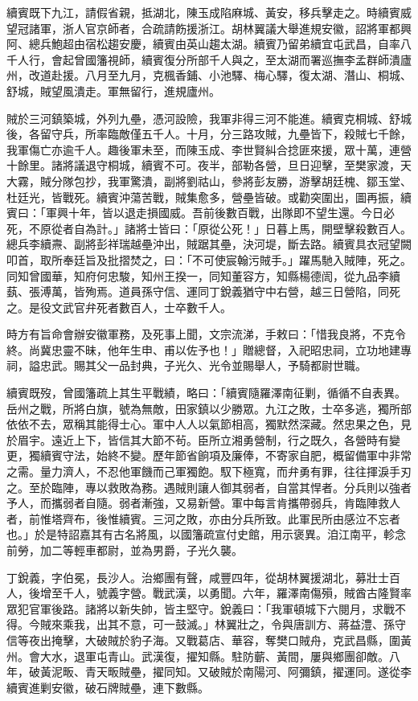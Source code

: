 \begin{pinyinscope}
續賓既下九江，請假省親，抵湖北，陳玉成陷麻城、黃安，移兵擊走之。時續賓威望冠諸軍，浙人官京師者，合疏請飭援浙江。胡林翼議大舉進規安徽，詔將軍都興阿、總兵鮑超由宿松趨安慶，續賓由英山趨太湖。續賓乃留弟續宜屯武昌，自率八千人行，會起曾國籓視師，續賓復分所部千人與之，至太湖而署巡撫李孟群師潰廬州，改道赴援。八月至九月，克楓香鋪、小池驛、梅心驛，復太湖、潛山、桐城、舒城，賊望風潰走。軍無留行，進規廬州。

賊於三河鎮築城，外列九壘，憑河設險，我軍非得三河不能進。續賓克桐城、舒城後，各留守兵，所率臨敵僅五千人。十月，分三路攻賊，九壘皆下，殺賊七千餘，我軍傷亡亦逾千人。趣後軍未至，而陳玉成、李世賢糾合捻匪來援，眾十萬，連營十餘里。諸將議退守桐城，續賓不可。夜半，部勒各營，旦日迎擊，至樊家渡，天大霧，賊分隊包抄，我軍驚潰，副將劉祜山，參將彭友勝，游擊胡廷槐、鄒玉堂、杜廷光，皆戰死。續賓沖蕩苦戰，賊集愈多，營壘皆破。或勸突圍出，圖再振，續賓曰：「軍興十年，皆以退走損國威。吾前後數百戰，出隊即不望生還。今日必死，不原從者自為計。」諸將士皆曰：「原從公死！」日暮上馬，開壁擊殺數百人。總兵李續燾、副將彭祥瑞越壘沖出，賊踞其壘，決河堤，斷去路。續賓具衣冠望闕叩首，取所奉廷旨及批摺焚之，曰：「不可使宸翰污賊手。」躍馬馳入賊陣，死之。同知曾國華，知府何忠駿，知州王揆一，同知董容方，知縣楊德訚，從九品李續蓺、張溥萬，皆殉焉。道員孫守信、運同丁銳義猶守中右營，越三日營陷，同死之。是役文武官弁死者數百人，士卒數千人。

時方有旨命會辦安徽軍務，及死事上聞，文宗流涕，手敕曰：「惜我良將，不克令終。尚冀忠靈不昧，他年生申、甫以佐予也！」贈總督，入祀昭忠祠，立功地建專祠，謚忠武。賜其父一品封典，子光久、光令並賜舉人，予騎都尉世職。

續賓既歿，曾國籓疏上其生平戰績，略曰：「續賓隨羅澤南征剿，循循不自表異。岳州之戰，所將白旗，號為無敵，田家鎮以少勝眾。九江之敗，士卒多逃，獨所部依依不去，眾稱其能得士心。軍中人人以氣節相高，獨默然深藏。然忠果之色，見於眉宇。遠近上下，皆信其大節不茍。臣所立湘勇營制，行之既久，各營時有變更，獨續賓守法，始終不變。歷年節省餉項及廉俸，不寄家自肥，概留備軍中非常之需。量力濟人，不忍他軍饑而己軍獨飽。馭下極寬，而弁勇有罪，往往揮淚手刃之。至於臨陣，專以救敗為務。遇賊則讓人御其弱者，自當其悍者。分兵則以強者予人，而攜弱者自隨。弱者漸強，又易新營。軍中每言肯攜帶弱兵，肯臨陣救人者，前惟塔齊布，後惟續賓。三河之敗，亦由分兵所致。此軍民所由感泣不忘者也。」於是特詔嘉其有古名將風，以國籓疏宣付史館，用示褒異。洎江南平，軫念前勞，加二等輕車都尉，並為男爵，子光久襲。

丁銳義，字伯冕，長沙人。治鄉團有聲，咸豐四年，從胡林翼援湖北，募壯士百人，後增至千人，號義字營。戰武漢，以勇聞。六年，羅澤南傷殞，賊酋古隆賢率眾犯官軍後路。諸將以新失帥，皆主堅守。銳義曰：「我軍頓城下六閱月，求戰不得。今賊來乘我，出其不意，可一鼓滅。」林翼壯之，令與唐訓方、蔣益澧、孫守信等夜出掩擊，大破賊於豹子海。又戰葛店、華容，奪樊口賊舟，克武昌縣，圍黃州。會大水，退軍屯青山。武漢復，擢知縣。駐防蘄、黃間，屢與鄉團卻敵。八年，破黃泥畈、青天畈賊壘，擢同知。又破賊於南陽河、阿彌鎮，擢運同。遂從李續賓進剿安徽，破石牌賊壘，連下數縣。


\end{pinyinscope}
